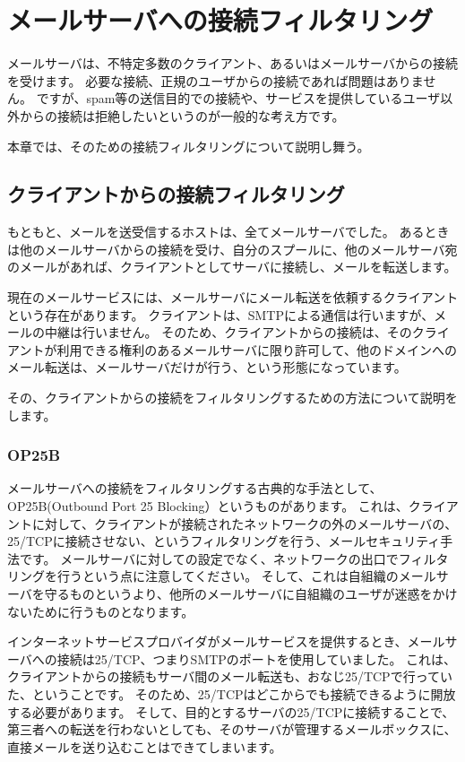 \chapter{メールサーバへの接続フィルタリング}

メールサーバは、不特定多数のクライアント、あるいはメールサーバからの接続を受けます。
必要な接続、正規のユーザからの接続であれば問題はありません。
ですが、spam等の送信目的での接続や、サービスを提供しているユーザ以外からの接続は拒絶したいというのが一般的な考え方です。

本章では、そのための接続フィルタリングについて説明し舞う。

\section{クライアントからの接続フィルタリング}

もともと、メールを送受信するホストは、全てメールサーバでした。
あるときは他のメールサーバからの接続を受け、自分のスプールに、他のメールサーバ宛のメールがあれば、クライアントとしてサーバに接続し、メールを転送します。

現在のメールサービスには、メールサーバにメール転送を依頼するクライアントという存在があります。
クライアントは、SMTPによる通信は行いますが、メールの中継は行いません。
そのため、クライアントからの接続は、そのクライアントが利用できる権利のあるメールサーバに限り許可して、他のドメインへのメール転送は、メールサーバだけが行う、という形態になっています。

その、クライアントからの接続をフィルタリングするための方法について説明をします。


\subsection{OP25B}

メールサーバへの接続をフィルタリングする古典的な手法として、OP25B(Outbound Port 25 Blocking）というものがあります。
これは、クライアントに対して、クライアントが接続されたネットワークの外のメールサーバの、25/TCPに接続させない、というフィルタリングを行う、メールセキュリティ手法です。
メールサーバに対しての設定でなく、ネットワークの出口でフィルタリングを行うという点に注意してください。
そして、これは自組織のメールサーバを守るものというより、他所のメールサーバに自組織のユーザが迷惑をかけないために行うものとなります。

インターネットサービスプロバイダがメールサービスを提供するとき、メールサーバへの接続は25/TCP、つまりSMTPのポートを使用していました。
これは、クライアントからの接続もサーバ間のメール転送も、おなじ25/TCPで行っていた、ということです。
そのため、25/TCPはどこからでも接続できるように開放する必要があります。
そして、目的とするサーバの25/TCPに接続することで、第三者への転送を行わないとしても、そのサーバが管理するメールボックスに、直接メールを送り込むことはできてしまいます。

